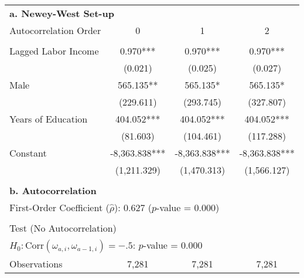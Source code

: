 \begin{tabular}{lccc} \toprule
 \multicolumn{4}{l}{\textbf{a. Newey-West Set-up}} \\
Autocorrelation Order & 0 & 1 & 2 \\ \\ 
Lagged Labor Income & 0.970*** & 0.970*** & 0.970*** \\
 & (0.021) & (0.025) & (0.027) \\
Male & 565.135** & 565.135* & 565.135* \\
 & (229.611) & (293.745) & (327.807) \\
Years of Education & 404.052*** & 404.052*** & 404.052*** \\
 & (81.603) & (104.461) & (117.288) \\
Constant & -8,363.838*** & -8,363.838*** & -8,363.838*** \\
 & (1,211.329) & (1,470.313) & (1,566.127) \\ \\ \midrule
 \multicolumn{4}{l}{\textbf{b. Autocorrelation}} \\
 \multicolumn{4}{l}{First-Order Coefficient ($\hat{\rho}$): 0.627 ($p$-value = 0.000)} \\ \\
 \multicolumn{4}{l}{Test (No Autocorrelation)} \\ 
  \multicolumn{4}{l}{$H_{0}: \text{Corr} \left( \omega_{a,i}, \omega_{a-1,i} \right) = -.5$: $p$-value = 0.000} \\ \midrule
   Observations & 7,281 & 7,281 & 7,281 \\ \bottomrule
\end{tabular}
